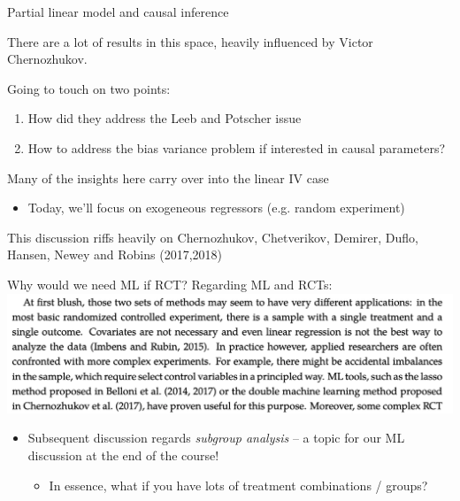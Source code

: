 \documentclass[notes,11pt, aspectratio=169]{beamer}
\newenvironment{wideitemize}{\itemize\addtolength{\itemsep}{10pt}}{\enditemize}
\begin{document}
\begin{frame}{Partial linear model and causal inference}
  \begin{wideitemize}
  \item There are a lot of results in this space, heavily influenced
    by Victor Chernozhukov.
  \item  Going to touch on two points:
  \begin{enumerate}
  \item How did they address the Leeb and Potscher issue
  \item How to address the bias variance problem if interested in causal parameters?
  \end{enumerate}
\item Many of the insights here carry over into the linear IV case
  \begin{itemize}
  \item Today, we'll focus on exogeneous regressors (e.g. random
    experiment)
  \end{itemize}
\item This discussion riffs heavily on Chernozhukov, Chetverikov,
  Demirer, Duflo, Hansen, Newey and Robins (2017,2018)
  \end{wideitemize}
\end{frame}

\begin{frame}{Why would we need ML if RCT?}
  Regarding ML and RCTs:
  \includegraphics[width=\linewidth]{duflo_chernozhukov_ECMA.png}
  
  \begin{itemize}
  \item   Subsequent discussion regards \emph{subgroup analysis} -- a topic
    for our ML discussion at the end of the course!
    \begin{itemize}
    \item In essence, what if you have lots of treatment combinations /
      groups?
    \end{itemize}
  \end{itemize}
\end{frame}
\end{document}
